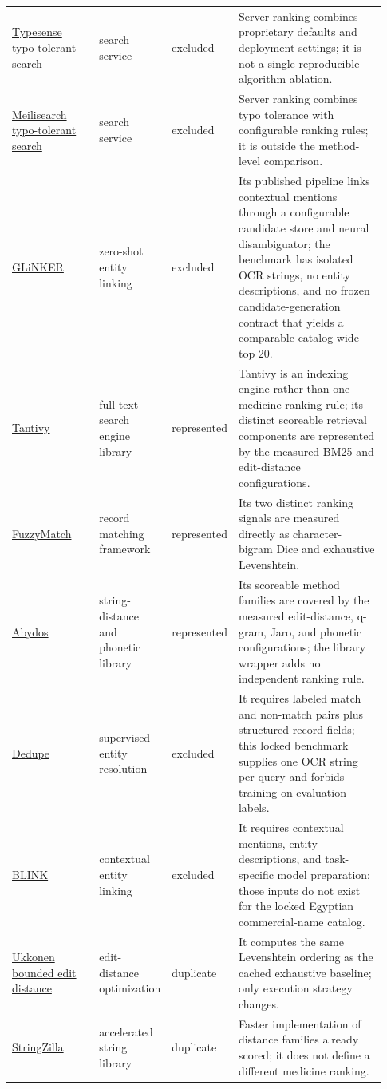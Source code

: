 \begin{landscape}
\begin{scriptsize}
\begin{longtable}{@{}L{0.24\linewidth}L{0.15\linewidth}L{0.12\linewidth}L{0.42\linewidth}@{}}
\href{https://github.com/typesense/typesense}{Typesense typo-tolerant search} & search service & excluded & Server ranking combines proprietary defaults and deployment settings; it is not a single reproducible algorithm ablation. \\
\href{https://github.com/meilisearch/meilisearch}{Meilisearch typo-tolerant search} & search service & excluded & Server ranking combines typo tolerance with configurable ranking rules; it is outside the method-level comparison. \\
\href{https://github.com/Knowledgator/GLinker}{GLiNKER} & zero-shot entity linking & excluded & Its published pipeline links contextual mentions through a configurable candidate store and neural disambiguator; the benchmark has isolated OCR strings, no entity descriptions, and no frozen candidate-generation contract that yields a comparable catalog-wide top 20. \\
\href{https://github.com/quickwit-oss/tantivy}{Tantivy} & full-text search engine library & represented & Tantivy is an indexing engine rather than one medicine-ranking rule; its distinct scoreable retrieval components are represented by the measured BM25 and edit-distance configurations. \\
\href{https://github.com/seamusabshere/fuzzy_match}{FuzzyMatch} & record matching framework & represented & Its two distinct ranking signals are measured directly as character-bigram Dice and exhaustive Levenshtein. \\
\href{https://github.com/chrislit/abydos}{Abydos} & string-distance and phonetic library & represented & Its scoreable method families are covered by the measured edit-distance, q-gram, Jaro, and phonetic configurations; the library wrapper adds no independent ranking rule. \\
\href{https://github.com/dedupeio/dedupe}{Dedupe} & supervised entity resolution & excluded & It requires labeled match and non-match pairs plus structured record fields; this locked benchmark supplies one OCR string per query and forbids training on evaluation labels. \\
\href{https://github.com/facebookresearch/BLINK}{BLINK} & contextual entity linking & excluded & It requires contextual mentions, entity descriptions, and task-specific model preparation; those inputs do not exist for the locked Egyptian commercial-name catalog. \\
\href{https://github.com/sunesimonsen/ukkonen}{Ukkonen bounded edit distance} & edit-distance optimization & duplicate & It computes the same Levenshtein ordering as the cached exhaustive baseline; only execution strategy changes. \\
\href{https://github.com/ashvardanian/StringZilla}{StringZilla} & accelerated string library & duplicate & Faster implementation of distance families already scored; it does not define a different medicine ranking. \\
\bottomrule
\end{longtable}
\end{scriptsize}


\end{landscape}
